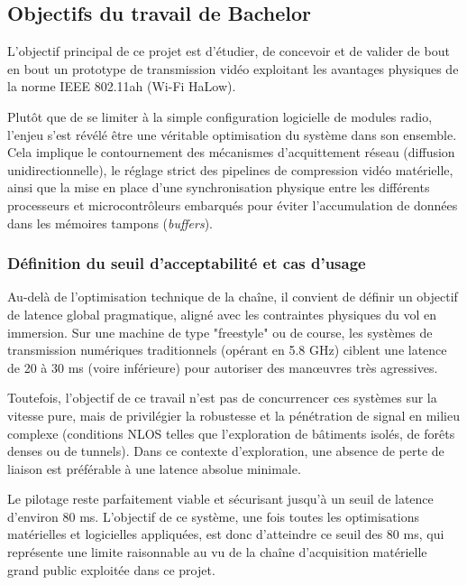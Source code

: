 \subsection{Objectifs du travail de Bachelor}
L'objectif principal de ce projet est d'étudier, de concevoir et de valider de bout en bout un prototype 
de transmission vidéo exploitant les avantages physiques de la norme IEEE 802.11ah (Wi-Fi HaLow). 

Plutôt que de se limiter à la simple configuration logicielle de modules radio, l'enjeu s'est révélé être 
une véritable optimisation du système dans son ensemble. Cela implique le contournement des mécanismes 
d'acquittement réseau (diffusion unidirectionnelle), le réglage strict des pipelines de compression vidéo 
matérielle, ainsi que la mise en place d'une synchronisation physique entre les différents processeurs 
et microcontrôleurs embarqués pour éviter l'accumulation de données dans les mémoires tampons 
(\textit{buffers}).

\subsubsection{Définition du seuil d'acceptabilité et cas d'usage}
Au-delà de l'optimisation technique de la chaîne, il convient de définir un objectif de latence global 
pragmatique, aligné avec les contraintes physiques du vol en immersion. Sur une machine de type 
"freestyle" ou de course, les systèmes de transmission numériques traditionnels (opérant en 5.8 GHz) 
ciblent une latence de 20 à 30 ms (voire inférieure) pour autoriser des manœuvres très agressives.

Toutefois, l'objectif de ce travail n'est pas de concurrencer ces systèmes sur la vitesse pure, mais de 
privilégier la robustesse et la pénétration de signal en milieu complexe (conditions NLOS telles que 
l'exploration de bâtiments isolés, de forêts denses ou de tunnels). Dans ce contexte d'exploration, une 
absence de perte de liaison est préférable à une latence absolue minimale. 

Le pilotage reste parfaitement viable et sécurisant jusqu'à un seuil de latence d'environ 80 ms. 
L'objectif de ce système, une fois toutes les optimisations matérielles et logicielles appliquées, 
est donc d'atteindre ce seuil des 80 ms, qui représente une limite raisonnable au vu de la
chaîne d'acquisition matérielle grand public exploitée dans ce projet.

